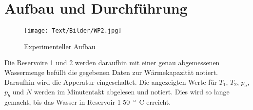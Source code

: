 \section{Aufbau und Durchführung}

\begin{figure}[H]
  \centering
  \texttt{[image: Text/Bilder/WP2.jpg]}
  \caption{Experimenteller Aufbau \cite[4]{sample}}
  \label{WP2}
\end{figure}
Die Reservoire 1 und 2 werden daraufhin mit einer
genau abgemessenen Wassermenge befüllt die gegebenen Daten zur Wärmekapazität notiert.
Daraufhin wird die Apperatur eingeschaltet. Die angezeigten Werte für $T_1$, $T_2$, $p_a$, $p_b$ und $N$ werden
im Minutentakt abgelesen und notiert.
Dies wird so lange gemacht, bis das Wasser in Reservoir 1 \SI{50}{°C} erreicht.
